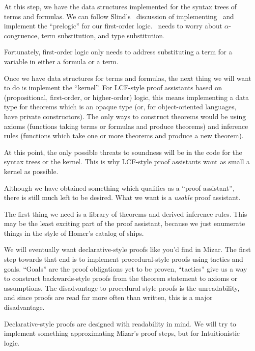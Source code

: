 \begin{node}[Prelogic]
At this step, we have the data structures implemented for the syntax
trees of terms and formulas. We can follow Slind's~\cite{slind1990implementation}
discussion of implementing \HOL\ and implement the ``prelogic'' for
our first-order logic. \HOL\ needs to worry about $\alpha$-congruence,
term substitution, and type substitution.

Fortunately, first-order logic only needs to address substituting a
term for a variable in either a formula or a term.
\end{node}

\begin{node}[Kernel]
Once we have data structures for terms and formulas, the next thing we
will want to do is implement the ``kernel''. For LCF-style proof
assistants based on (propositional, first-order, or higher-order)
logic, this means implementing a data type for theorems which is an
opaque type (or, for object-oriented languages, have private
constructors). The only ways to construct theorems would be using
axioms (functions taking terms or formulas and produce theorems) and
inference rules (functions which take one or more theorems and produce
a new theorem).

At this point, the only possible threats to soundness will be in the
code for the syntax trees or the kernel. This is why LCF-style proof
assistants want as small a kernel as possible.
\end{node}

\begin{node}
Although we have obtained something which qualifies as a ``proof assistant'',
there is still much left to be desired.
What we want is a \emph{usable} proof assistant.

The first thing we need is a library of theorems and derived inference
rules. This may be the least exciting part of the proof assistant,
because we just enumerate things in the style of Homer's catalog of ships.
\end{node}

\begin{node}
We will eventually want declarative-style proofs like you'd find in
Mizar. The first step towards that end is to implement
procedural-style proofs using tactics and goals. ``Goals'' are the
proof obligations yet to be proven, ``tactics'' give us a way to
construct backwards-style proofs from the theorem statement to axioms
or assumptions. The disadvantage to procedural-style proofs is the
unreadability, and since proofs are read far more often than written,
this is a major disadvantage.

Declarative-style proofs are designed with readability in mind. We
will try to implement something approximating Mizar's proof steps, but
for Intuitionistic logic.
\end{node}


